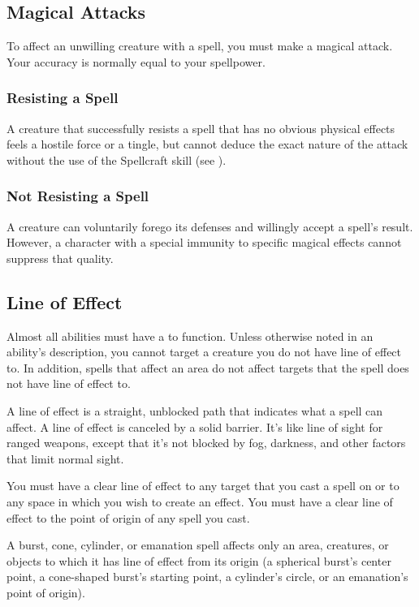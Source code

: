     \subsection{Magical Attacks}

        To affect an unwilling creature with a spell, you must make a magical attack.
        Your accuracy is normally equal to your spellpower.

        \subsubsection{Resisting a Spell} A creature that successfully resists a spell that has no obvious physical effects feels a hostile force or a tingle, but cannot deduce the exact nature of the attack without the use of the Spellcraft skill (see ).

        \subsubsection{Not Resisting a Spell} A creature can voluntarily forego its defenses and willingly accept a spell's result.
            However, a character with a special immunity to specific magical effects cannot suppress that quality.

    \subsection{Line of Effect}\label{Line of Effect}

        Almost all abilities must have a  to function.
        Unless otherwise noted in an ability's description, you cannot target a creature you do not have line of effect to.
        In addition, spells that affect an area do not affect targets that the spell does not have line of effect to.

        A line of effect is a straight, unblocked path that indicates what a spell can affect.
        A line of effect is canceled by a solid barrier.
        It's like line of sight for ranged weapons, except that it's not blocked by fog, darkness, and other factors that limit normal sight.

        You must have a clear line of effect to any target that you cast a spell on or to any space in which you wish to create an effect.
        You must have a clear line of effect to the point of origin of any spell you cast.

        A burst, cone, cylinder, or emanation spell affects only an area, creatures, or objects to which it has line of effect from its origin (a spherical burst's center point, a cone-shaped burst's starting point, a cylinder's circle, or an emanation's point of origin).

